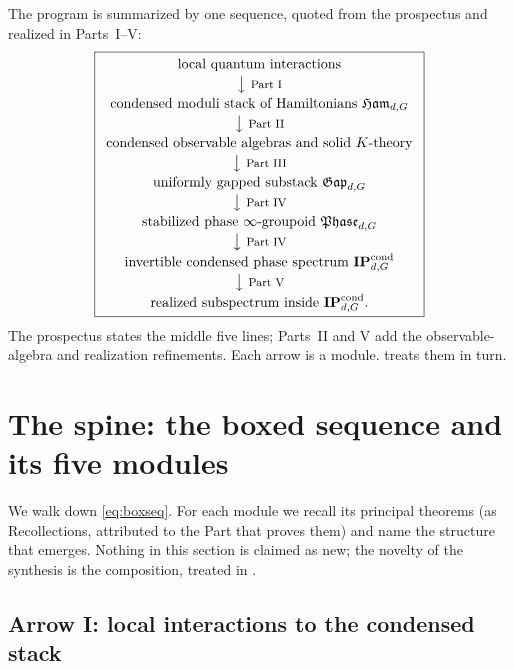 \documentclass[12pt]{article}
\newcommand{\Ham}{\mathfrak{Ham}}              %
\newcommand{\Gap}{\mathfrak{Gap}}              %
\newcommand{\Phase}{\mathfrak{Phase}}          %
\newcommand{\IPcond}{\mathbf{IP}^{\mathrm{cond}}}  %
\theoremstyle{plain}
\theoremstyle{definition}
\theoremstyle{remark}
\begin{document}
The program is summarized by one sequence, quoted from the prospectus and realized in
Parts~I--V\@:
\begin{equation}
\label{eq:boxseq}
\boxed{
\begin{array}{c}
\text{local quantum interactions}\\[2pt]
\big\downarrow\ \text{\footnotesize Part I}\\[2pt]
\text{condensed moduli stack of Hamiltonians }\Ham_{d,G}\\[2pt]
\big\downarrow\ \text{\footnotesize Part II}\\[2pt]
\text{condensed observable algebras and solid }K\text{-theory}\\[2pt]
\big\downarrow\ \text{\footnotesize Part III}\\[2pt]
\text{uniformly gapped substack }\Gap_{d,G}\\[2pt]
\big\downarrow\ \text{\footnotesize Part IV}\\[2pt]
\text{stabilized phase }\infty\text{-groupoid }\Phase_{d,G}\\[2pt]
\big\downarrow\ \text{\footnotesize Part IV}\\[2pt]
\text{invertible condensed phase spectrum }\IPcond_{d,G}\\[2pt]
\big\downarrow\ \text{\footnotesize Part V}\\[2pt]
\text{realized subspectrum inside }\IPcond_{d,G}.
\end{array}}
\end{equation}
The prospectus states the middle five lines; Parts~II and V add the observable-algebra
and realization refinements. Each arrow is a module.  treats them in
turn.

\section{The spine: the boxed sequence and its five modules}
\label{sec:spine}

We walk down \eqref{eq:boxseq}. For each module we recall its principal theorems (as
Recollections, attributed to the Part that proves them) and name the structure that
emerges. Nothing in this section is claimed as new; the novelty of the synthesis is the
composition, treated in .

\subsection{Arrow I: local interactions to the condensed stack}
\label{sec:arrowI}
\end{document}
